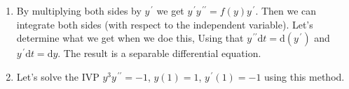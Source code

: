 \documentclass{ximera}
\begin{document}
 \begin{enumerate}
    \item  By multiplying both sides by $y^{\,\prime}$ we get  $y^{\,\prime}y^{\,\prime\prime}=f(y)y^{\,\prime}$.  Then we can integrate both sides (with respect to the independent variable).  Let's determine what we get when we doe this, Using that $y^{\,\prime\prime} \mathrm{d}t=\mathrm{d}(y^{\,\prime})$ and $y^{\,\prime} \mathrm{d}t=\mathrm{d}y$.  The result is a separable differential equation.


    \vfill
    

    \item Let's  solve  the IVP $y^3y^{\,\prime\prime}=-1$, $y(1)=1$, $y^{\,\prime}(1)=-1$ using this method.


    
\vfill
\vfill
\vfill

     
 \end{enumerate}
\end{document}
